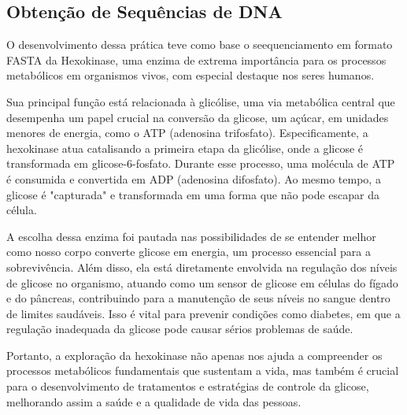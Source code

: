 \documentclass{article}
\begin{document}
\subsection{Obtenção de Sequências de DNA}

O desenvolvimento dessa prática teve como base o seequenciamento em formato FASTA da Hexokinase, uma enzima de extrema importância para os processos metabólicos em organismos vivos, com especial destaque nos seres humanos. 

Sua principal função está relacionada à glicólise, uma via metabólica central que desempenha um papel crucial na conversão da glicose, um açúcar, em unidades menores de energia, como o ATP (adenosina trifosfato). Especificamente, a hexokinase atua catalisando a primeira etapa da glicólise, onde a glicose é transformada em glicose-6-fosfato. Durante esse processo, uma molécula de ATP é consumida e convertida em ADP (adenosina difosfato). Ao mesmo tempo, a glicose é "capturada" e transformada em uma forma que não pode escapar da célula.

A escolha dessa enzima foi pautada nas possibilidades de se entender melhor como nosso corpo converte glicose em energia, um processo essencial para a sobrevivência.
Além disso, ela está diretamente envolvida na regulação dos níveis de glicose no organismo, atuando como um sensor de glicose em células do fígado e do pâncreas, contribuindo para a manutenção de seus níveis no sangue dentro de limites saudáveis. Isso é vital para prevenir condições como diabetes, em que a regulação inadequada da glicose pode causar sérios problemas de saúde.

Portanto, a exploração da hexokinase não apenas nos ajuda a compreender os processos metabólicos fundamentais que sustentam a vida, mas também é crucial para o desenvolvimento de tratamentos e estratégias de controle da glicose, melhorando assim a saúde e a qualidade de vida das pessoas.
\end{document}
